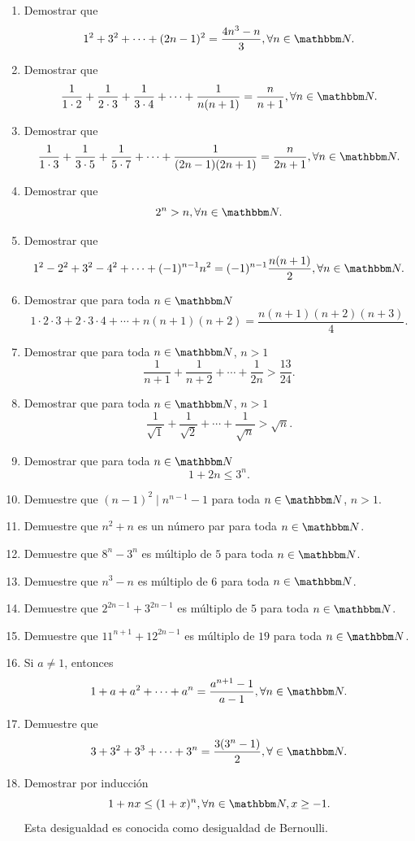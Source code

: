 \begin{enumerate}
    \item Demostrar que
    $$1^2+3^2+\cdots +(2n-1)^2=\frac{4n^3-n}{3}, \forall n \in \NN.$$
    \item Demostrar que
    $$\frac{1}{1\cdot 2}+\frac{1}{2\cdot 3}+\frac{1}{3\cdot 4}+\cdots +\frac{1}{n(n+1)}=\frac{n}{n+1}, \forall n \in \NN.$$
    \item Demostrar que
    $$\frac{1}{1\cdot 3}+\frac{1}{3\cdot 5}+\frac{1}{5\cdot 7}+\cdots +\frac{1}{(2n-1)(2n+1)}=\frac{n}{2n+1}, \forall n \in \NN.$$
    \item Demostrar que
    $$2^n>n, \forall n \in \NN.$$
    \item Demostrar que
    $$1^2-2^2+3^2-4^2+\cdots +(-1)^{n-1}n^2=(-1)^{n-1} \frac{n(n+1)}{2}, \forall n \in \NN.$$
    \item Demostrar que para toda $n \in \NN$
    $$1 \cdot 2 \cdot 3 + 2\cdot 3 \cdot 4 + \cdots + n(n+1)(n+2) = \frac{n(n+1)(n+2)(n+3)}{4}.$$
    \item Demostrar que para toda $n \in \NN$, $n>1$
    $$\frac{1}{n+1}+\frac{1}{n+2}+\cdots +\frac{1}{2n}>\frac{13}{24}.$$
    \item Demostrar que para toda $n \in \NN$, $n>1$
    $$\frac{1}{\sqrt{1}}+\frac{1}{\sqrt{2}}+\cdots +\frac{1}{\sqrt{n}}>\sqrt{n}.$$
    \item Demostrar que para toda $n \in \NN$
    $$1+2n \leq 3^n.$$
    \item Demuestre que $(n-1)^2 \mid n^{n-1}-1$ para toda $n \in \NN$, $n>1$.
    \item Demuestre que $n^2+n$ es un número par para toda $n \in \NN$.
    \item Demuestre que $8^n-3^n$ es múltiplo de $5$ para toda $n \in \NN$.
    \item Demuestre que $n^3-n$ es múltiplo de $6$ para toda $n \in \NN$.
    \item Demuestre que $2^{2n-1}+3^{2n-1}$ es múltiplo de $5$ para toda $n \in \NN$.
    \item Demuestre que $11^{n+1}+12^{2n-1}$ es múltiplo de $19$ para toda $n \in \NN$.
    \item Si $a \neq 1$, entonces
    $$1+a+a^2+\cdots +a^n=\frac{a^{n+1}-1}{a-1}, \forall n \in \NN.$$
    \item Demuestre que
    $$3+3^2+3^3+\cdots +3^n=\frac{3(3^n-1)}{2}, \forall \in \NN.$$\newpage
    \item Demostrar por inducción
    $$1+nx \leq (1+x)^n, \forall n \in \NN, x \geq -1.$$
    Esta desigualdad es conocida como desigualdad de Bernoulli.

\end{enumerate}
